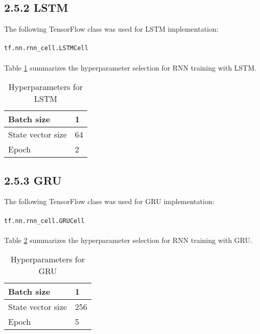 \subsection*{2.5.2 LSTM}
The following TensorFlow class was used for LSTM implementation:\\ \\
\texttt{tf.nn.rnn\_cell.LSTMCell}\\ \\
Table \ref{lstm-table} summarizes the hyperparameter selection for RNN training with LSTM.
\begin{table}[h]
\centering
\begin{tabular}{|l|l|}
\hline
 Batch size & 1 \\ \hline
 State vector size & 64 \\ \hline
 Epoch & 2 \\ \hline
\end{tabular}
\caption{Hyperparameters for LSTM}
\label{lstm-table}
\end{table}

\subsection*{2.5.3 GRU}
The following TensorFlow class was used for GRU implementation:\\ \\
\texttt{tf.nn.rnn\_cell.GRUCell}\\ \\
Table \ref{gru-table} summarizes the hyperparameter selection for RNN training with GRU.

\begin{table}[h]
\centering
\begin{tabular}{|l|l|}
\hline
 Batch size & 1 \\ \hline
 State vector size & 256 \\ \hline
 Epoch & 5 \\ \hline
\end{tabular}
\caption{Hyperparameters for GRU}
\label{gru-table}
\end{table}


